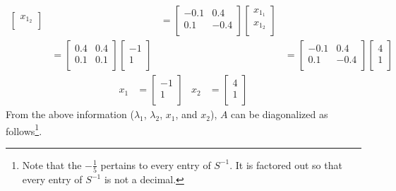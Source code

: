 \documentclass[titlepage]{article}
\begin{document}
\begin{align*}
\begin{bmatrix}
        x_{1_2}\\
    \end{bmatrix}&
        &=
        \begin{bmatrix}
            -0.1 & 0.4\\
            0.1 & -0.4\\
        \end{bmatrix}
        \begin{bmatrix}
            x_{1_1}\\
            x_{1_2}\\
        \end{bmatrix}\\
    &=
    \begin{bmatrix}
        0.4 & 0.4\\
        0.1 & 0.1\\
    \end{bmatrix}
    \begin{bmatrix}
        -1\\
        1\\
    \end{bmatrix}&
        &=
        \begin{bmatrix}
            -0.1 & 0.4\\
            0.1 & -0.4\\
        \end{bmatrix}
        \begin{bmatrix}
            4\\
            1\\
        \end{bmatrix}
\end{align*}
\begin{align*}
    x_1 &=
    \begin{bmatrix}
        -1\\
        1\\
    \end{bmatrix}&
        x_2 &=
        \begin{bmatrix}
            4\\
            1\\
        \end{bmatrix}
\end{align*}
From the above information ($\lambda_1$, $\lambda_2$, $x_1$, and $x_2$), $A$ can be diagonalized as follows\footnote{Note that the $-\frac{1}{5}$ pertains to every entry of $S^{-1}$. It is factored out so that every entry of $S^{-1}$ is not a decimal.}.
\end{document}
